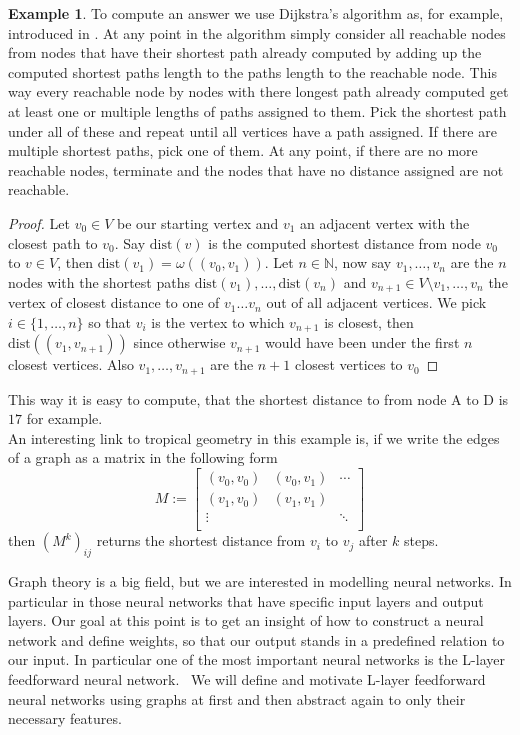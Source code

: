 \documentclass{article}
\theoremstyle{definition}
\newtheorem{example}[theorem]{Example}
\begin{document}
\begin{example}
To compute an answer we use Dijkstra's algorithm as, for example, introduced in \cite{borg2014script}. At any point in the algorithm simply consider all reachable nodes from nodes that have their shortest path already computed by adding up the computed shortest paths length to the paths length to the reachable node. This way every reachable node by nodes with there longest path already computed get at least one or multiple lengths of paths assigned to them. Pick the shortest path under all of these and repeat until all vertices have a path assigned. If there are multiple shortest paths, pick one of them. At any point, if there are no more reachable nodes, terminate and the nodes that have no distance assigned are not reachable.
\begin{proof}
Let $v_0 \in V$ be our starting vertex and $v_1$ an adjacent vertex with the closest path to $v_0$. Say $\text{dist}(v)$ is the computed shortest distance from node $v_0$ to $v \in V$, then $\text{dist}(v_1) = \omega((v_0, v_1))$. Let $n \in \mathbb{N}$, now say $v_1, \dots , v_n$ are the $n$ nodes with the shortest paths $\text{dist}(v_1), \dots , \text{dist}(v_n)$ and $v_{n+1} \in V \setminus {v_1, \dots , v_n}$ the vertex of closest distance to one of $v_1 \dots v_n$ out of all adjacent vertices. We pick $i \in \{ 1 , \dots , n \}$ so that $v_i$ is the vertex to which $v_{n+1}$ is closest, then $\text{dist}((v_1, v_{n+1}))$ since otherwise $v_{n+1}$ would have been under the first $n$ closest vertices. Also $v_1 , \dots , v_{n+1}$ are the $n+1$  closest vertices to $v_0$
\end{proof}

This way it is easy to compute, that the shortest distance to from node A to D is $17$ for example. \\
An interesting link to tropical geometry in this example is, if we write the edges of a graph as a matrix in the following form
$$M := \left[ \begin{array}{rrrr}
(v_0, v_0) & (v_0, v_1) & \cdots \\
(v_1, v_0) & (v_1, v_1)  \\
\vdots &  & \ddots \\
\end{array}\right]$$
then $(M^{k})_{ij}$ returns the shortest distance from $v_i$ to $v_j$ after $k$ steps.
\end{example}

Graph theory is a big field, but we are interested in modelling neural networks. In particular in those neural networks that have specific input layers and output layers. Our goal at this point is to get an insight of how to construct a neural network and define weights, so that our output stands in a predefined relation to our input.
In particular one of the most important neural networks is the L-layer feedforward neural network. \
We will define and motivate L-layer feedforward neural networks using graphs at first and then abstract again to only their necessary features.
\end{document}
